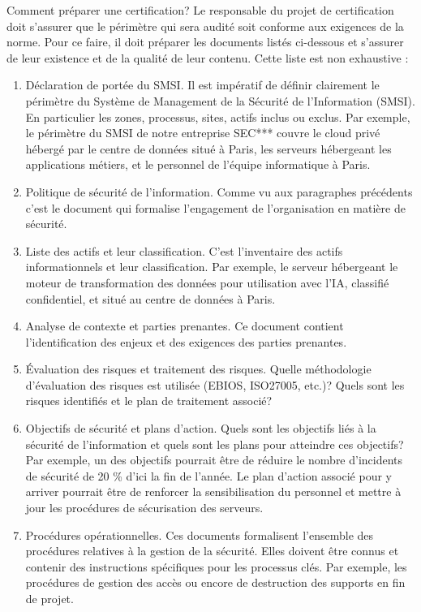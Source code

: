 Comment préparer une certification? Le responsable du projet de certification doit s'assurer que le périmètre qui sera audité soit conforme aux exigences de la norme. Pour ce faire, il doit préparer les documents listés ci-dessous et s'assurer de leur existence et de la qualité de leur contenu.
Cette liste est non exhaustive :
\begin{enumerate}
    \item Déclaration de portée du SMSI. Il est impératif de définir clairement le périmètre du Système de Management de la Sécurité de l'Information (SMSI). En particulier les zones, processus, sites, actifs inclus ou exclus. Par exemple, le périmètre du SMSI de notre entreprise SEC*** couvre le cloud privé hébergé par le centre de données situé à Paris, les serveurs hébergeant les applications métiers, et le personnel de l'équipe informatique à Paris.
    \item Politique de sécurité de l'information. Comme vu aux paragraphes précédents c'est le document qui formalise l'engagement de l'organisation en matière de sécurité.
    \item Liste des actifs et leur classification. C'est l'inventaire des actifs informationnels et leur classification. Par exemple, le serveur hébergeant le moteur de transformation des données pour utilisation avec l'IA, classifié confidentiel, et situé au centre de données à Paris.
    \item Analyse de contexte et parties prenantes. Ce document contient l'identification des enjeux et des exigences des parties prenantes.
    \item Évaluation des risques et traitement des risques. Quelle méthodologie d’évaluation des risques est utilisée (EBIOS, ISO27005, etc.)? Quels sont les risques identifiés et le plan de traitement associé?
    \item Objectifs de sécurité et plans d’action. Quels sont les objectifs liés à la sécurité de l'information et quels sont les plans pour atteindre ces objectifs? Par exemple, un des objectifs pourrait être de réduire le nombre d'incidents de sécurité de 20 \% d'ici la fin de l'année. Le plan d’action associé pour y arriver pourrait être de renforcer la sensibilisation du personnel et mettre à jour les procédures de sécurisation des serveurs.
    \item Procédures opérationnelles. Ces documents formalisent l'ensemble des procédures relatives à la gestion de la sécurité. Elles doivent être connus et contenir des instructions spécifiques pour les processus clés. Par exemple, les procédures de gestion des accès ou encore de destruction des supports en fin de projet.

\end{enumerate}
